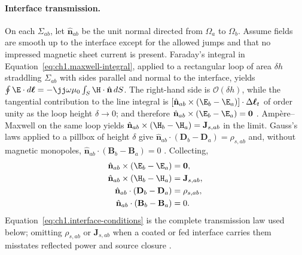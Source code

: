 \paragraph{Interface transmission.}
On each $\Sigma_{ab}$, let $\hat{\mathbf{n}}_{ab}$ be the unit normal directed from $\Omega_a$ to $\Omega_b$. Assume fields are smooth up to the interface except for the allowed jumps and that no impressed magnetic sheet current is present. Faraday's integral in Equation~\eqref{eq:ch1.maxwell-integral}, applied to a rectangular loop of area $\delta h$ straddling $\Sigma_{ab}$ with sides parallel and normal to the interface, yields $\oint \E\cdot d\boldsymbol{\ell}=-\jj\omega\mu_0\int_S \H\cdot\hat{\mathbf{n}}\,dS$. The right-hand side is $\mathcal{O}(\delta h)$, while the tangential contribution to the line integral is $[\hat{\mathbf{n}}_{ab}\times(\E_b-\E_a)]\cdot\Delta\boldsymbol{\ell}_t$ of order unity as the loop height $\delta\to 0$; and therefore $\hat{\mathbf{n}}_{ab}\times(\E_b-\E_a)=\mathbf{0}$ \cite{maxwell1873,jackson1999}. Amp\`ere--Maxwell on the same loop yields $\hat{\mathbf{n}}_{ab}\times(\H_b-\H_a)=\mathbf{J}_{s,ab}$ in the limit. Gauss's laws applied to a pillbox of height $\delta$ give $\hat{\mathbf{n}}_{ab}\cdot(\mathbf{D}_b-\mathbf{D}_a)=\rho_{s,ab}$ and, without magnetic monopoles, $\hat{\mathbf{n}}_{ab}\cdot(\mathbf{B}_b-\mathbf{B}_a)=0$ \cite{stratton1941}. Collecting,
\begin{equation}
\label{eq:ch1.interface-conditions}
\begin{aligned}
\hat{\mathbf{n}}_{ab}\times(\E_b-\E_a)&=\mathbf{0},\\
\hat{\mathbf{n}}_{ab}\times(\H_b-\H_a)&=\mathbf{J}_{s,ab},\\
\hat{\mathbf{n}}_{ab}\cdot(\mathbf{D}_b-\mathbf{D}_a)&=\rho_{s,ab},\\
\hat{\mathbf{n}}_{ab}\cdot(\mathbf{B}_b-\mathbf{B}_a)&=0.
\end{aligned}
\end{equation}
Equation~\eqref{eq:ch1.interface-conditions} is the complete transmission law used below; omitting $\rho_{s,ab}$ or $\mathbf{J}_{s,ab}$ when a coated or fed interface carries them misstates reflected power and source closure \cite{collin2001,jackson1999}.

